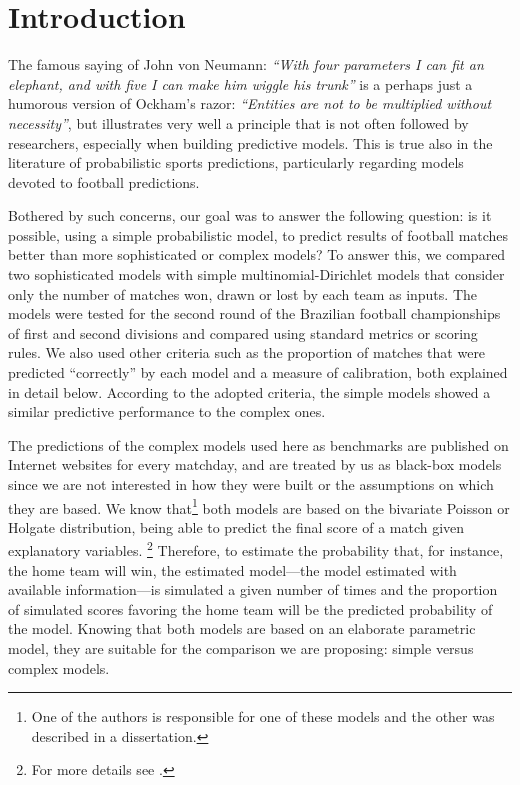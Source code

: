 \documentclass[journal,article,accept,moreauthors,pdftex,12pt,a4paper]{mdpi}
\begin{document}

\section{Introduction}

The famous saying of John von Neumann: {\it ``With four parameters I can fit an elephant, and with five I can make him wiggle his trunk''} is a perhaps just a humorous version of Ockham's razor: 
{\it``Entities are not to be multiplied without necessity''}, but illustrates very well a principle that is not often followed by researchers, especially when building predictive models. 
This is true also in the literature of probabilistic sports predictions, particularly regarding models devoted to football predictions.

Bothered by such concerns, our goal was to answer the following question: is it possible, using a simple probabilistic model, to predict results of football matches better than more sophisticated or complex models?
To answer this, we compared two sophisticated models with simple multinomial-Dirichlet models that consider only the number of matches won, drawn or lost by each team as inputs.
The models were tested for the second round of the Brazilian football championships of first and second divisions and compared using standard metrics or scoring rules.
We also used other criteria such as the proportion of matches that were predicted ``correctly'' by each model and a measure of calibration, both explained in detail below.
According to the adopted criteria, the simple models showed a similar predictive performance to the complex ones.

The predictions of the complex models used here as benchmarks are published on Internet websites for every matchday, and are treated by us as black-box models since we are not interested in how they were built or the assumptions on which they are based.
We know that\footnote{One of the authors is responsible for one of these models and the other was described in a dissertation.} both models are based on the bivariate Poisson or Holgate distribution, being able to predict the final score of a match given explanatory variables.
\footnote{For more details see \cite{arruda2000}.}
Therefore, to estimate the probability that, for instance, the home team will win, the estimated model---the model estimated with available information---is simulated a given number of times and the proportion of simulated scores favoring the home team will be the predicted probability of the model.
Knowing that both models are based on an elaborate parametric model, they are suitable for the comparison we are proposing: simple versus complex models.
\end{document}
